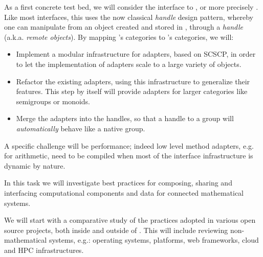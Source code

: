 \begin{workpackage}[id=component-architecture,wphases=3-24!.5,
  title=Component Architecture,lead=UV,
  PSRM=24,UVRM=1,SARM=1, USHRM=4]
\begin{tasklist}
\begin{task}[title=Interfaces between systems,id=interface-systems]
    As a first concrete test bed, we will consider the \Sage interface
    to \GAP, or more precisely \libGAP.  Like most \Sage interfaces,
    this uses the now classical \emph{handle} design pattern, whereby
    one can manipulate from \Sage an object created and stored in
    \GAP, through a \emph{handle} (a.k.a. \emph{remote objects}).  By
    mapping \GAP's categories to \Sage's categories, we will:
    \begin{itemize}
    \item Implement a modular infrastructure for adapters, based on
      SCSCP, in order to let the implementation of adapters scale to a
      large variety of objects.
    \item Refactor the existing adapters, using this infrastructure to
      generalize their features. This step by itself will provide
      adapters for larger categories like semigroups or monoids.
    \item Merge the adapters into the handles, so that a handle to a
      \GAP group will \emph{automatically} behave like a native \Sage
      group.
    \end{itemize}
    A specific challenge will be performance; indeed low level method
    adapters, e.g. for arithmetic, need to be compiled when most of
    the interface infrastructure is dynamic by nature.


  \end{task}

  \begin{task}[title=Modularization and packaging,id=mod-packaging]
    In this task we will investigate best practices for composing,
    sharing and interfacing computational components and data for
    connected mathematical systems.

    We will start with a comparative study of the practices adopted in
    various open source projects, both inside and outside of
    \TheProject. This will include reviewing non-mathematical systems,
    e.g.: operating systems, platforms, web frameworks, cloud and HPC
    infrastructures.


\end{task}
\end{tasklist}
\end{workpackage}
